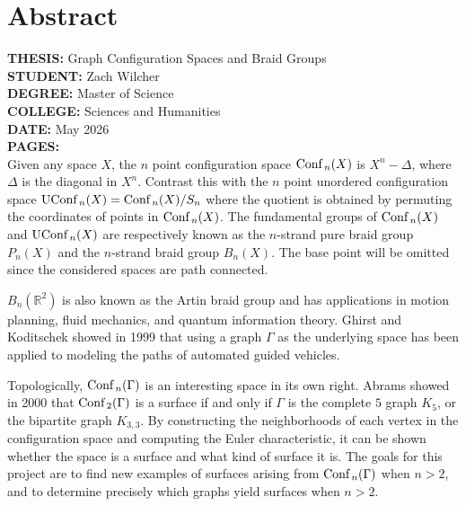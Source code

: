 \chapter*{Abstract}
{\bf THESIS:} Graph Configuration Spaces and Braid Groups
\\{\bf STUDENT:} Zach Wilcher
\\{\bf DEGREE:} Master of Science
\\{\bf COLLEGE:} Sciences and Humanities
\\{\bf DATE:} May 2026
\\{\bf PAGES:} \pageref{LastPage}
\\
Given any space \(X\), the \(n\) point configuration space \(\text{Conf}\,_n(X)\) is 
\(X^n - \Delta\), where \(\Delta\) is the diagonal in \(X^n\). 
Contrast this with the \(n\) point unordered configuration space \(\text{UConf}\,_n(X) = \text{Conf}\,_n(X) / S_n\)
where the quotient is obtained by permuting the coordinates of points in \(\text{Conf}\,_n(X)\).
The fundamental groups of \(\text{Conf}\,_n(X)\) and \(\text{UConf}\,_n(X)\) are respectively known as the \(n\)-strand pure braid group
\(P_n(X)\) and the \(n\)-strand braid group \(B_n(X)\).
The base point will be omitted since the considered spaces are path connected.

\(B_n(\mathbb{R}^2)\) is also known as the Artin braid group and has applications
in motion planning, fluid mechanics, and quantum information theory.
Ghirst and Koditschek showed in 1999 that using a graph \(\Gamma\) as the underlying space has 
been applied to modeling the paths of automated guided vehicles.

Topologically, \(\text{Conf}\,_n(\Gamma)\) is an interesting space in its own right. 
Abrams showed in 2000 that \(\text{Conf}\,_2(\Gamma)\) is a surface if and only if \(\Gamma\)
is the complete \(5\) graph \(K_5\), or the bipartite graph \(K_{3,3}\).
By constructing the neighborhoods of each vertex in the configuration space
and computing the Euler characteristic, it can be shown
whether the space is a surface and what kind of surface it is.
The goals for this project are to 
find new examples of surfaces arising from \(\text{Conf}\,_n(\Gamma)\) when \(n > 2\),
and to determine precisely which graphs yield surfaces when \(n > 2\).